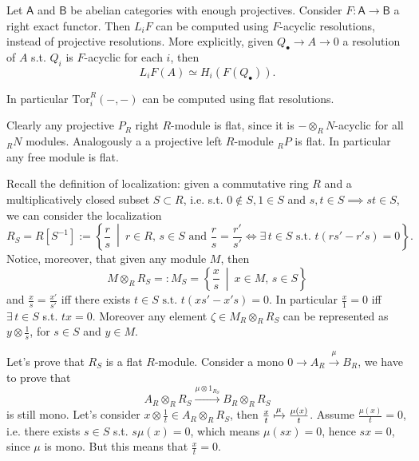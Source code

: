 \begin{lem}
	Let $\mathsf{A}$ and $\mathsf{B}$ be abelian categories with enough projectives.
	Consider $F: \mathsf{A} \to \mathsf{B}$ a right exact functor.
	Then $L_iF$ can be computed using $F$-acyclic resolutions, instead of projective resolutions.
	More explicitly, given
	$Q_{\bullet} \to A \to 0$ a resolution of $A$ s.t. $Q_i$ is $F$-acyclic for each $i$, then
	\begin{equation}
		L_iF(A) \simeq H_i \left( F(Q_{\bullet}) \right)
	.\end{equation} 
\end{lem} 

\begin{rem}[]
	In particular $\mathrm{Tor}_i^R(-,-)$ can be computed using flat resolutions.
\end{rem}

\begin{ex}
	Clearly any projective $P_R$ right $R$-module is flat, since it is $- \otimes_R N$-acyclic for
	all ${}_RN$ modules.
	Analogously a a projective left $R$-module ${}_RP$ is flat.
	In particular any free module is flat.
\end{ex}

\begin{ex}
	Recall the definition of localization:
	given a commutative ring $R$ and a multiplicatively closed subset $S \subset R$, 
	i.e. s.t. $0 \notin S, 1 \in S$ and $s,t \in S \implies st \in S$, 
	we can consider the localization
	\begin{equation}
	R_S = R \left[ S^{-1} \right] :=
	\left\{ \frac{r}{s} \ \middle|\ r \in R, \, s \in S \text{ and } \frac{r}{s} = \frac{r'}{s'}
	\iff \exists\, t \in S \text{ s.t. } t \left( rs' - r's \right) = 0 \right\}
	.\end{equation} 
	Notice, moreover, that given any module $M$, then
	\begin{equation}
	M \otimes_R R_S =: M_S =
	\left\{ \frac{x}{s} \ \middle|\ x \in M, \, s \in S \right\}
	\end{equation} 
	and $\frac{x}{s} = \frac{x'}{s'}$ iff there exists $t \in S \text{ s.t. } t \left( xs' - x's \right) = 0$.
	In particular $\frac{x}{1} = 0$ iff $\exists\, t \in S$ s.t. $tx = 0$.
	Moreover any element $\zeta \in M_R \otimes_R R_S$ can be represented as $y \otimes \frac{1}{s}$,
	for $s \in S$ and $y \in M$.

	Let's prove that $R_S$ is a flat $R$-module.
	Consider a mono $0 \to A_R \xrightarrow{\mu} B_R$, we have to prove that
	\begin{equation}
	A_R \otimes_R R_S \xrightarrow{\mu \otimes 1_{R_S}} B_R \otimes_R R_S
	\end{equation}
	is still mono.
	Let's consider $x \otimes \frac{1}{t} \in A_R \otimes_R R_S$, then 
	$\frac{x}{t} \xmapsto{\mu} \frac{\mu(x)}{t}$.
	Assume $\frac{\mu(x)}{t} = 0$, i.e. there exists $s \in S$ s.t. $s \mu(x) = 0$,
	which means $\mu(sx) = 0$, hence $sx = 0$, since $\mu$ is mono.
	But this means that $\frac{x}{t} = 0$.
\end{ex}

